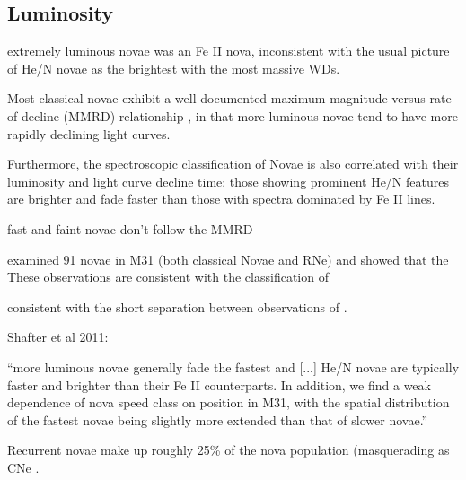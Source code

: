 \subsection{Luminosity}


extremely luminous novae \citep{Czekala:2013}
was an Fe II nova, inconsistent with the usual picture of He/N novae as the brightest with the most massive WDs.

Most classical novae exhibit a well-documented maximum-magnitude versus
rate-of-decline (MMRD) relationship \citep{McLaughlin:1945}, in that
more luminous novae tend to have more rapidly declining light curves.

Furthermore, the spectroscopic classification
of Novae is also correlated with their luminosity and light curve
decline time: those showing prominent He/N features are brighter and
fade faster than those with spectra dominated by Fe II lines.

fast and faint novae don't follow the MMRD \citep{Kasliwal:2011}


\citet{Shafter:2011} examined 91 novae in M31 (both classical Novae
and RNe) and showed that the   These observations are consistent with the classification of 

consistent with the
short separation between observations of \spock. 


Shafter et al 2011:

``more luminous novae generally fade the fastest and [...]  He/N novae
are typically faster and brighter than their Fe II counterparts. In
addition, we find a weak dependence of nova speed class on position in
M31, with the spatial distribution of the fastest novae being slightly
more extended than that of slower novae.''


Recurrent novae make up roughly 25\% of the nova population
(masquerading as CNe \citep{Pagnotta:2014}.

